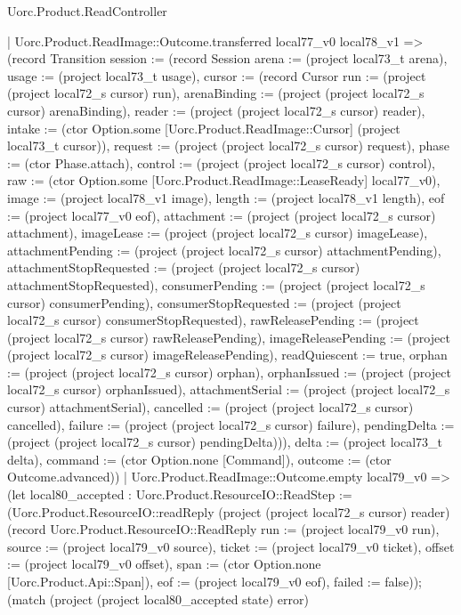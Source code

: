 \begin{lexlean}{Uorc.Product.ReadController}
\begin{semanticmodule}
{    | Uorc.Product.ReadImage::Outcome.transferred local77_v0 local78_v1 => (record Transition {session := (record Session {arena := (project local73_t arena), usage := (project local73_t usage), cursor := (record Cursor {run := (project (project local72_s cursor) run), arenaBinding := (project (project local72_s cursor) arenaBinding), reader := (project (project local72_s cursor) reader), intake := (ctor Option.some [Uorc.Product.ReadImage::Cursor] (project local73_t cursor)), request := (project (project local72_s cursor) request), phase := (ctor Phase.attach), control := (project (project local72_s cursor) control), raw := (ctor Option.some [Uorc.Product.ReadImage::LeaseReady] local77_v0), image := (project local78_v1 image), length := (project local78_v1 length), eof := (project local77_v0 eof), attachment := (project (project local72_s cursor) attachment), imageLease := (project (project local72_s cursor) imageLease), attachmentPending := (project (project local72_s cursor) attachmentPending), attachmentStopRequested := (project (project local72_s cursor) attachmentStopRequested), consumerPending := (project (project local72_s cursor) consumerPending), consumerStopRequested := (project (project local72_s cursor) consumerStopRequested), rawReleasePending := (project (project local72_s cursor) rawReleasePending), imageReleasePending := (project (project local72_s cursor) imageReleasePending), readQuiescent := true, orphan := (project (project local72_s cursor) orphan), orphanIssued := (project (project local72_s cursor) orphanIssued), attachmentSerial := (project (project local72_s cursor) attachmentSerial), cancelled := (project (project local72_s cursor) cancelled), failure := (project (project local72_s cursor) failure), pendingDelta := (project (project local72_s cursor) pendingDelta)})}), delta := (project local73_t delta), command := (ctor Option.none [Command]), outcome := (ctor Outcome.advanced)})
    | Uorc.Product.ReadImage::Outcome.empty local79_v0 => (let local80_accepted : Uorc.Product.ResourceIO::ReadStep := (Uorc.Product.ResourceIO::readReply (project (project local72_s cursor) reader) (record Uorc.Product.ResourceIO::ReadReply {run := (project local79_v0 run), source := (project local79_v0 source), ticket := (project local79_v0 ticket), offset := (project local79_v0 offset), span := (ctor Option.none [Uorc.Product.Api::Span]), eof := (project local79_v0 eof), failed := false})); (match (project (project local80_accepted state) error)
}
\end{semanticmodule}
\end{lexlean}

